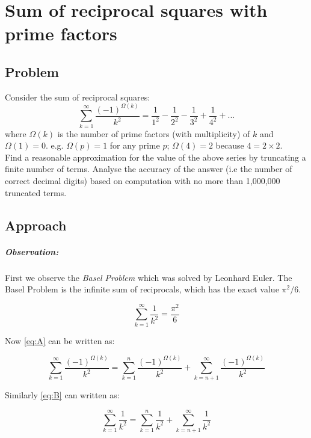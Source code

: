 \documentclass[11pt]{report}
\begin{document}
\chapter{Sum of reciprocal squares with prime factors}
\section*{Problem}
Consider the sum of reciprocal squares:
\begin{equation}
	\sum_{k=1}^{\infty} \frac{(-1)^{\Omega(k)}}{k^2} = \frac{1}{1^2} - \frac{1}{2^2} - \frac{1}{3^2} + \frac{1}{4^2} + ... \label{eq:A}
\end{equation}
where $\Omega(k)$ is the number of prime factors (with multiplicity) of $k$ and $\Omega(1) = 0$. e.g. $\Omega(p)=1$ for any prime $p$; $\Omega(4)=2$ because $4=2\times2$. \\

Find a reasonable approximation for the value of the above series by truncating a finite number of terms. Analyse the accuracy of the answer (i.e the number of correct decimal digits) based on computation with no more than 1,000,000 truncated terms. 

\section{Approach}
\paragraph{Observation:}
First we observe the \textit{Basel Problem} which was solved by Leonhard Euler. The Basel Problem is the infinite sum of reciprocals, which has the exact value $\pi^2/6$.

\begin{equation}
	\sum_{k=1}^{\infty} \frac{1}{k^2} = \frac{\pi^2}{6} \label{eq:B}
\end{equation}

Now \eqref{eq:A} can be written as:

\begin{equation*}
	\sum_{k=1}^{\infty} \frac{(-1)^{\Omega(k)}}{k^2} = \sum_{k=1}^{n} \frac{(-1)^{\Omega(k)}}{k^2} + \sum_{k=n+1}^{\infty} \frac{(-1)^{\Omega(k)}}{k^2}
\end{equation*}

Similarly \eqref{eq:B} can written as:

\begin{equation*}
	\sum_{k=1}^{\infty} \frac{1}{k^2} = \sum_{k=1}^{n} \frac{1}{k^2} + \sum_{k=n+1}^{\infty} \frac{1}{k^2}
\end{equation*}
\end{document}
